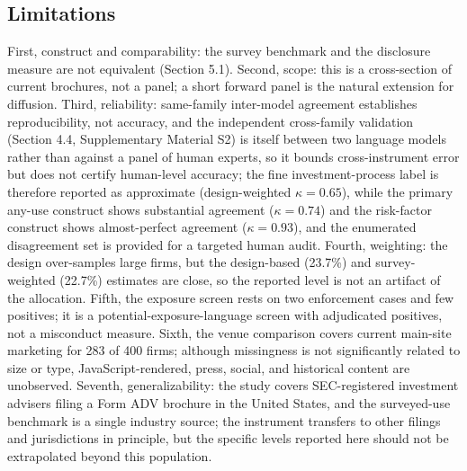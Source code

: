 \documentclass[utf8]{FrontiersinHarvard} %
\begin{document}
\subsection{Limitations}
First, construct and comparability: the survey benchmark and the disclosure measure are not equivalent (Section 5.1). Second, scope: this is a cross-section of current brochures, not a panel; a short forward panel is the natural extension for diffusion. Third, reliability: same-family inter-model agreement establishes reproducibility, not accuracy, and the independent cross-family validation (Section 4.4, Supplementary Material S2) is itself between two language models rather than against a panel of human experts, so it bounds cross-instrument error but does not certify human-level accuracy; the fine investment-process label is therefore reported as approximate (design-weighted $\kappa = 0.65$), while the primary any-use construct shows substantial agreement ($\kappa = 0.74$) and the risk-factor construct shows almost-perfect agreement ($\kappa = 0.93$), and the enumerated disagreement set is provided for a targeted human audit. Fourth, weighting: the design over-samples large firms, but the design-based (23.7\%) and survey-weighted (22.7\%) estimates are close, so the reported level is not an artifact of the allocation. Fifth, the exposure screen rests on two enforcement cases and few positives; it is a potential-exposure-language screen with adjudicated positives, not a misconduct measure. Sixth, the venue comparison covers current main-site marketing for 283 of 400 firms; although missingness is not significantly related to size or type, JavaScript-rendered, press, social, and historical content are unobserved. Seventh, generalizability: the study covers SEC-registered investment advisers filing a Form ADV brochure in the United States, and the surveyed-use benchmark is a single industry source; the instrument transfers to other filings and jurisdictions in principle, but the specific levels reported here should not be extrapolated beyond this population.
\end{document}
